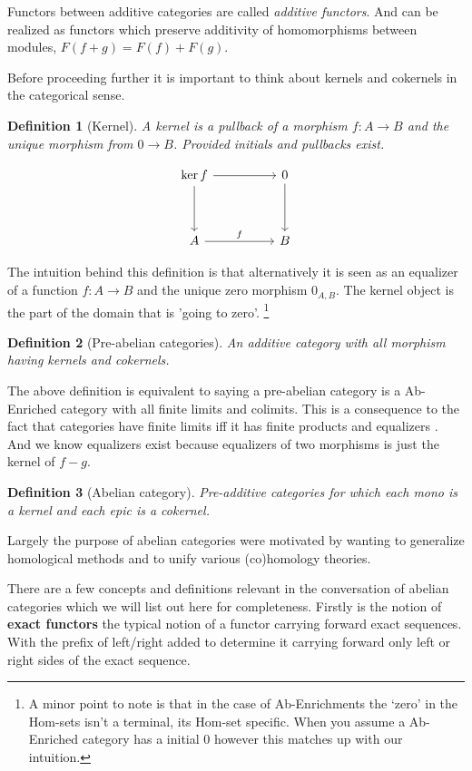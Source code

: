 \documentclass[12pt]{article}
\numberwithin{equation}{section}
\newtheorem{definition}{Definition}[section]
\begin{document}
	Functors between additive categories are called \textit{additive functors}. And can be realized as functors which preserve additivity of homomorphisms between modules, $F(f+g)=F(f)+F(g).$
	
	Before proceeding further it is important to think about kernels and cokernels in the categorical sense.
	\begin{definition}[Kernel]
		A kernel is a pullback of a morphism $f:A \to B$ and the unique morphism from $0 \to B$. Provided initials and pullbacks exist.
		
		\[\begin{tikzcd}
			{\ker f} && 0 \\
			\\
			A && B
			\arrow["f", from=3-1, to=3-3]
			\arrow[from=1-3, to=3-3]
			\arrow[from=1-1, to=1-3]
			\arrow[from=1-1, to=3-1]
		\end{tikzcd}\]
	\end{definition}
	The intuition behind this definition is that alternatively it is seen as an equalizer of a function $f:A \to B$ and the unique zero morphism $0_{A,B}$. The kernel object is the part of the domain that is 'going to zero'. \footnote{A minor point to note is that in the case of Ab-Enrichments the `zero' in the Hom-sets isn't a terminal, its Hom-set specific. When you assume a Ab-Enriched category has a initial 0 however this matches up with our intuition.}
	
	
	\begin{definition}[Pre-abelian categories]
		An additive category with all morphism having kernels and cokernels.
	\end{definition}
	The above definition is equivalent to saying a pre-abelian category is a Ab-Enriched category with all finite limits and colimits. This is a consequence to the fact that categories have finite limits iff it has finite products and equalizers \cite[Prop.~5.21]{Awodey}. And we know equalizers exist because equalizers of two morphisms is just the kernel of $f-g$.
	
	
	
	
	\begin{definition}[Abelian category]
		 Pre-additive categories for which each mono is a kernel and each epic is a cokernel.
	\end{definition}
	Largely the purpose of abelian categories were motivated by wanting to generalize homological methods and to unify various (co)homology theories.
	
	There are a few concepts and definitions relevant in the conversation of abelian categories which we will list out here for completeness. Firstly is the notion of \textbf{exact functors} the typical notion of a functor carrying forward exact sequences. With the prefix of left/right added to determine it carrying forward only left or right sides of the exact sequence.
	
\end{document}

